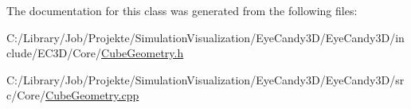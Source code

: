 The documentation for this class was generated from the following files\+:\begin{DoxyCompactItemize}
\item 
C\+:/\+Library/\+Job/\+Projekte/\+Simulation\+Visualization/\+Eye\+Candy3\+D/\+Eye\+Candy3\+D/include/\+E\+C3\+D/\+Core/\mbox{\hyperlink{_cube_geometry_8h}{Cube\+Geometry.\+h}}\item 
C\+:/\+Library/\+Job/\+Projekte/\+Simulation\+Visualization/\+Eye\+Candy3\+D/\+Eye\+Candy3\+D/src/\+Core/\mbox{\hyperlink{_cube_geometry_8cpp}{Cube\+Geometry.\+cpp}}\end{DoxyCompactItemize}
